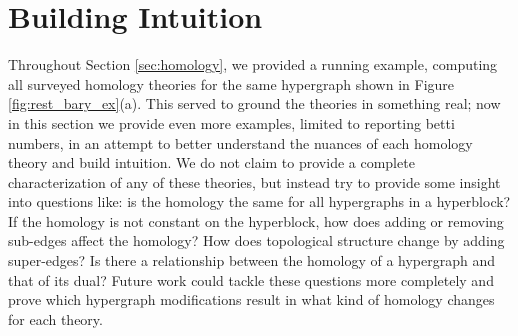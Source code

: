 \documentclass{amsart}
\begin{document}

\section{Building Intuition}
\label{sec:intuition}



Throughout Section \ref{sec:homology}, we provided a running example, computing all surveyed homology theories for the same hypergraph shown in Figure \ref{fig:rest_bary_ex}(a). 
This served to ground the theories in something real; now in this section we provide even more examples, limited to reporting betti numbers, in an attempt to better understand the nuances of each homology theory and build intuition. We do not claim to provide a complete characterization of any of these theories, but instead try to provide some insight into questions like: is the homology the same for all hypergraphs in a hyperblock? If the homology is not constant on the hyperblock, how does adding or removing sub-edges affect the homology? How does topological structure change by adding super-edges? Is there a relationship between the homology of a hypergraph and that of its dual?
Future work could tackle these questions more completely and prove which hypergraph modifications result in what kind of homology changes for each theory.
\end{document}
